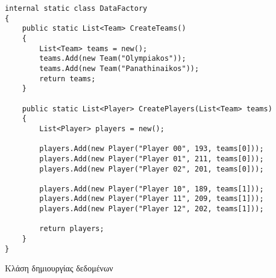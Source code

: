 \begin{listing}[htbp]
\begin{verbatim}
internal static class DataFactory
{
    public static List<Team> CreateTeams()
    {
        List<Team> teams = new();
        teams.Add(new Team("Olympiakos"));
        teams.Add(new Team("Panathinaikos"));
        return teams;
    }

    public static List<Player> CreatePlayers(List<Team> teams)
    {
        List<Player> players = new();

        players.Add(new Player("Player 00", 193, teams[0]));
        players.Add(new Player("Player 01", 211, teams[0]));
        players.Add(new Player("Player 02", 201, teams[0]));

        players.Add(new Player("Player 10", 189, teams[1]));
        players.Add(new Player("Player 11", 209, teams[1]));
        players.Add(new Player("Player 12", 202, teams[1]));

        return players;
    }
}
\end{verbatim}
\caption{Κλάση δημιουργίας δεδομένων}
\label{delegDataFactory}
\end{listing}